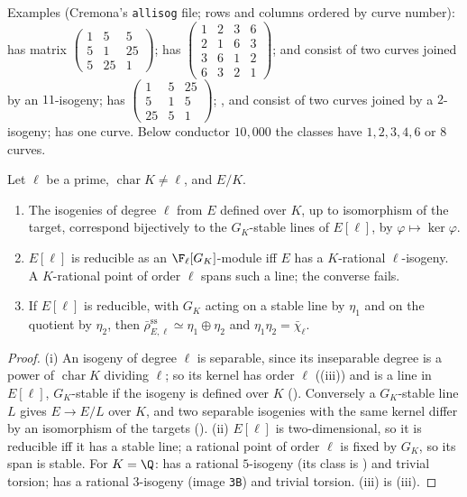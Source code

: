 \noindent Examples (Cremona's \texttt{allisog} file; rows and columns ordered by curve number):  has matrix $\left(\begin{smallmatrix}1&5&5\\5&1&25\\5&25&1\end{smallmatrix}\right)$;
 has $\left(\begin{smallmatrix}1&2&3&6\\2&1&6&3\\3&6&1&2\\6&3&2&1\end{smallmatrix}\right)$;  and  consist of two curves joined by an $11$-isogeny;
 has $\left(\begin{smallmatrix}1&5&25\\5&1&5\\25&5&1\end{smallmatrix}\right)$; ,  and  consist of two curves joined by a $2$-isogeny;  has one curve. Below
conductor $10{,}000$ the classes have $1,2,3,4,6$ or $8$ curves.

\begin{proposition}\label{prop:ellcurves:isogline}
Let $\ell$ be a prime, $\operatorname{char}K\ne\ell$, and $E/K$.
\begin{enumerate}[label=(\roman*)]
\item The isogenies of degree $\ell$ from $E$ defined over $K$, up to isomorphism of the target, correspond bijectively to the $G_K$-stable lines of $E[\ell]$, by $\varphi\mapsto\ker\varphi$.
\item $E[\ell]$ is reducible as an $\F_\ell[G_K]$-module iff $E$ has a $K$-rational $\ell$-isogeny. A $K$-rational point of order $\ell$ spans such a line; the converse fails.
\item If $E[\ell]$ is reducible, with $G_K$ acting on a stable line by $\eta_1$ and on the quotient by $\eta_2$, then $\bar\rho_{E,\ell}^{\mathrm{ss}}\simeq\eta_1\oplus\eta_2$ and $\eta_1\eta_2=\bar\chi_\ell$.
\end{enumerate}
\end{proposition}

\begin{proof}
(i) An isogeny of degree $\ell$ is separable, since its inseparable degree is a power of $\operatorname{char}K$ dividing $\ell$; so its kernel has order $\ell$ ((iii)) and
is a line in $E[\ell]$, $G_K$-stable if the isogeny is defined over $K$ (). Conversely a $G_K$-stable line $L$ gives $E\to E/L$ over $K$, and two separable
isogenies with the same kernel differ by an isomorphism of the targets (). (ii) $E[\ell]$ is two-dimensional, so it is reducible iff it has a stable line; a
rational point of order $\ell$ is fixed by $G_K$, so its span is stable. For $K=\Q$:  has a rational $5$-isogeny (its class is ) and trivial torsion; 
has a rational $3$-isogeny (image \texttt{3B}) and trivial torsion. (iii) is (iii).
\end{proof}

